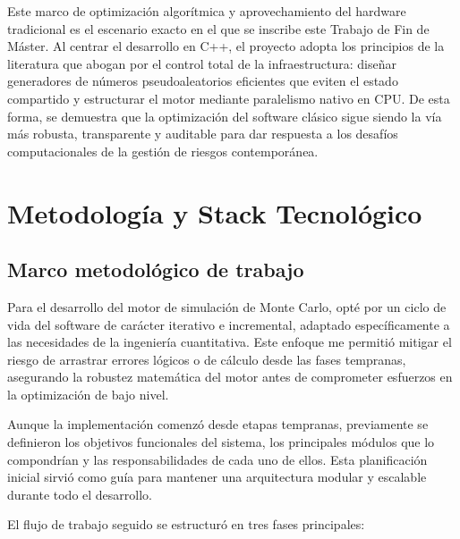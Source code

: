 \documentclass[11pt]{article}
\begin{document}
Este marco de optimización algorítmica y aprovechamiento del hardware tradicional es el escenario exacto en el que se inscribe este Trabajo de Fin de Máster. Al centrar el desarrollo en C++, el proyecto adopta los principios de la literatura que abogan por el control total de la infraestructura: diseñar generadores de números pseudoaleatorios eficientes que eviten el estado compartido y estructurar el motor mediante paralelismo nativo en CPU. De esta forma, se demuestra que la optimización del software clásico sigue siendo la vía más robusta, transparente y auditable para dar respuesta a los desafíos computacionales de la gestión de riesgos contemporánea.

\section{Metodología y Stack Tecnológico}
    \subsection{Marco metodológico de trabajo}

Para el desarrollo del motor de simulación de Monte Carlo, opté por un ciclo de vida del software de carácter iterativo e incremental, adaptado específicamente a las necesidades de la ingeniería cuantitativa. Este enfoque me permitió mitigar el riesgo de arrastrar errores lógicos o de cálculo desde las fases tempranas, asegurando la robustez matemática del motor antes de comprometer esfuerzos en la optimización de bajo nivel.

Aunque la implementación comenzó desde etapas tempranas, previamente se definieron los objetivos funcionales del sistema, los principales módulos que lo compondrían y las responsabilidades de cada uno de ellos. Esta planificación inicial sirvió como guía para mantener una arquitectura modular y escalable durante todo el desarrollo.

El flujo de trabajo seguido se estructuró en tres fases principales:
\end{document}
